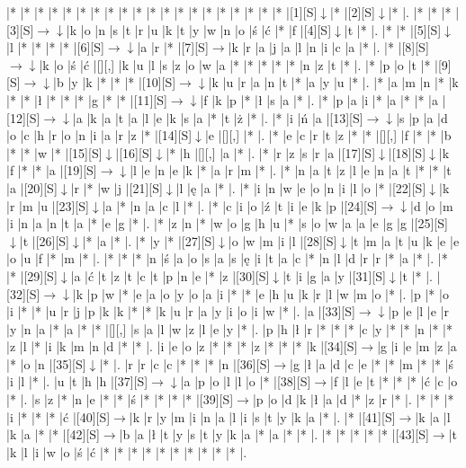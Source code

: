 \documentclass[11pt]{article}
\newcommand\drarr{$\rightarrow \!\!\!\!\! \downarrow$}
\newcommand\rarr{$\rightarrow$}
\newcommand\darr{$\downarrow$}
\begin{document}
\noindent\begin{Puzzle}{23}{27}|*	|*	|*	|*	|*	|*	|*	|*	|*	|*	|*	|*	|*	|*	|*	|*	|*	|*	|*	|*	|[1][S]\darr	|*	|[2][S]\darr	|*	|.
|*	|*	|*	|[3][S]\drarr	|k	|o	|n	|s	|t	|r	|u	|k	|t	|y	|w	|n	|o	|ś	|ć	|*	|f	|[4][S]\darr	|t	|*	|.
|*	|*	|[5][S]\darr	|l	|*	|*	|*	|*	|[6][S]\drarr	|a	|r	|*	|[7][S]\rarr	|k	|r	|a	|j	|a	|l	|n	|i	|c	|a	|*	|.
|*	|[8][S]\drarr	|k	|o	|ś	|ć	|[][,]{ }	|k	|u	|l	|s	|z	|o	|w	|a	|*	|*	|*	|*	|*	|n	|z	|t	|*	|.
|*	|p	|o	|t	|*	|[9][S]\drarr	|b	|y	|k	|*	|*	|*	|[10][S]\drarr	|k	|u	|r	|a	|n	|t	|*	|a	|y	|u	|*	|.
|*	|a	|m	|n	|*	|k	|*	|*	|ł	|*	|*	|*	|g	|*	|*	|[11][S]\drarr	|f	|k	|p	|*	|ł	|s	|a	|*	|.
|*	|p	|a	|i	|*	|a	|*	|*	|a	|[12][S]\drarr	|a	|k	|a	|t	|a	|l	|e	|k	|s	|a	|*	|t	|ż	|*	|.
|*	|i	|ń	|a	|[13][S]\drarr	|s	|p	|a	|d	|o	|c	|h	|r	|o	|n	|i	|a	|r	|z	|*	|[14][S]\darr	|e	|[][,]{ }	|*	|.
|*	|e	|c	|r	|t	|z	|*	|*	|[][,]{ }	|f	|*	|*	|b	|*	|*	|w	|*	|[15][S]\darr	|[16][S]\darr	|*	|h	|[][,]{ }	|a	|*	|.
|*	|r	|z	|s	|r	|a	|[17][S]\darr	|[18][S]\darr	|k	|f	|*	|*	|a	|[19][S]\drarr	|l	|e	|n	|e	|k	|*	|a	|r	|m	|*	|.
|*	|n	|a	|t	|z	|l	|e	|n	|a	|t	|*	|*	|t	|a	|[20][S]\darr	|r	|*	|w	|j	|[21][S]\darr	|l	|ę	|a	|*	|.
|*	|i	|n	|w	|e	|o	|n	|i	|l	|o	|*	|[22][S]\darr	|k	|r	|m	|u	|[23][S]\darr	|a	|*	|n	|a	|c	|l	|*	|.
|*	|c	|i	|o	|ź	|t	|i	|e	|k	|p	|[24][S]\drarr	|d	|o	|m	|i	|n	|a	|n	|t	|a	|*	|e	|g	|*	|.
|*	|z	|n	|*	|w	|o	|g	|h	|u	|*	|s	|o	|w	|a	|a	|e	|g	|g	|[25][S]\darr	|t	|[26][S]\darr	|*	|a	|*	|.
|*	|y	|*	|[27][S]\darr	|o	|w	|m	|i	|l	|[28][S]\darr	|t	|m	|a	|t	|u	|k	|e	|e	|o	|u	|f	|*	|m	|*	|.
|*	|*	|*	|n	|ś	|a	|o	|s	|a	|s	|ę	|i	|t	|a	|c	|*	|n	|l	|d	|r	|r	|*	|a	|*	|.
|*	|*	|[29][S]\darr	|a	|ć	|t	|z	|t	|c	|t	|p	|n	|e	|*	|z	|[30][S]\darr	|t	|i	|g	|a	|y	|[31][S]\darr	|t	|*	|.
|[32][S]\drarr	|k	|p	|w	|*	|e	|a	|o	|y	|o	|a	|i	|*	|*	|e	|h	|u	|k	|r	|l	|w	|m	|o	|*	|.
|p	|*	|o	|i	|*	|*	|u	|r	|j	|p	|k	|k	|*	|*	|k	|u	|r	|a	|y	|i	|o	|i	|w	|*	|.
|a	|[33][S]\drarr	|p	|e	|l	|e	|r	|y	|n	|a	|*	|a	|*	|*	|[][,]{ }	|s	|a	|l	|w	|z	|l	|e	|y	|*	|.
|p	|h	|ł	|r	|*	|*	|*	|c	|y	|*	|*	|n	|*	|*	|z	|l	|*	|i	|k	|m	|n	|d	|*	|*	|.
|i	|e	|o	|z	|*	|*	|*	|z	|*	|*	|*	|k	|[34][S]\rarr	|g	|i	|e	|m	|z	|a	|*	|o	|n	|[35][S]\darr	|*	|.
|r	|r	|c	|c	|*	|*	|*	|n	|[36][S]\rarr	|g	|ł	|a	|d	|c	|e	|*	|*	|m	|*	|*	|ś	|i	|l	|*	|.
|u	|t	|h	|h	|[37][S]\drarr	|a	|p	|o	|l	|l	|o	|*	|[38][S]\rarr	|f	|l	|e	|t	|*	|*	|*	|ć	|c	|o	|*	|.
|s	|z	|*	|n	|e	|*	|*	|ś	|*	|*	|*	|*	|[39][S]\rarr	|p	|o	|d	|k	|ł	|a	|d	|*	|z	|r	|*	|.
|*	|*	|*	|i	|*	|*	|*	|ć	|[40][S]\rarr	|k	|r	|y	|m	|i	|n	|a	|l	|i	|s	|t	|y	|k	|a	|*	|.
|*	|[41][S]\rarr	|k	|a	|l	|k	|a	|*	|*	|[42][S]\rarr	|b	|a	|ł	|t	|y	|s	|t	|y	|k	|a	|*	|a	|*	|*	|.
|*	|*	|*	|*	|*	|[43][S]\rarr	|t	|k	|l	|i	|w	|o	|ś	|ć	|*	|*	|*	|*	|*	|*	|*	|*	|*	|*	|.\end{Puzzle}
\end{document}
